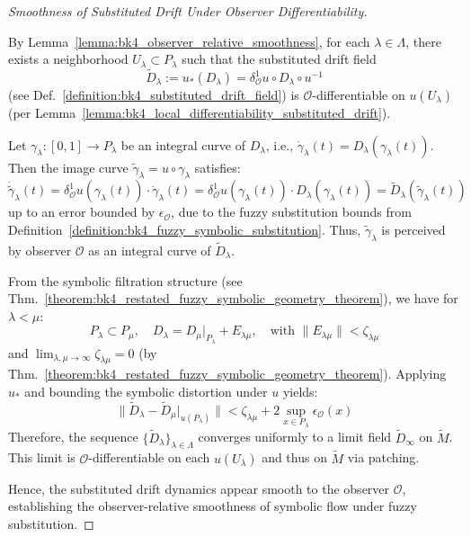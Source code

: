 \begin{proof}[Smoothness of Substituted Drift Under Observer Differentiability]
\label{proof:bk4_substituted_drift_smoothness}
\leavevmode

By Lemma~\ref{lemma:bk4_observer_relative_smoothness}, for each $\lambda \in \Lambda$, there exists a neighborhood $U_\lambda \subset P_\lambda$ such that the substituted drift field
\[
\tilde{D}_\lambda := u_*(D_\lambda) = \delta^1_\mathcal{O}u \circ D_\lambda \circ u^{-1}
\]
(see Def.~\ref{definition:bk4_substituted_drift_field}) is $\mathcal{O}$-differentiable on $u(U_\lambda)$ (per Lemma~\ref{lemma:bk4_local_differentiability_substituted_drift}).

Let $\gamma_\lambda: [0,1] \to P_\lambda$ be an integral curve of $D_\lambda$, i.e., $\dot{\gamma}_\lambda(t) = D_\lambda(\gamma_\lambda(t))$. Then the image curve $\tilde{\gamma}_\lambda = u \circ \gamma_\lambda$ satisfies:
\[
\dot{\tilde{\gamma}}_\lambda(t) = \delta^1_\mathcal{O}u(\gamma_\lambda(t)) \cdot \dot{\gamma}_\lambda(t) = \delta^1_\mathcal{O}u(\gamma_\lambda(t)) \cdot D_\lambda(\gamma_\lambda(t)) = \tilde{D}_\lambda(\tilde{\gamma}_\lambda(t))
\]
up to an error bounded by $\epsilon_\mathcal{O}$, due to the fuzzy substitution bounds from Definition~\ref{definition:bk4_fuzzy_symbolic_substitution}. Thus, $\tilde{\gamma}_\lambda$ is perceived by observer $\mathcal{O}$ as an integral curve of $\tilde{D}_\lambda$.

From the symbolic filtration structure (see Thm.~\ref{theorem:bk4_restated_fuzzy_symbolic_geometry_theorem}), we have for $\lambda < \mu$:
\[
P_\lambda \subset P_\mu, \quad D_\lambda = D_\mu|_{P_\lambda} + E_{\lambda\mu}, \quad \text{with } \|E_{\lambda\mu}\| < \zeta_{\lambda\mu}
\]
and $\lim_{\lambda, \mu \to \infty} \zeta_{\lambda\mu} = 0$ (by Thm.~\ref{theorem:bk4_restated_fuzzy_symbolic_geometry_theorem}). Applying $u_*$ and bounding the symbolic distortion under $u$ yields:
\[
\|\tilde{D}_\lambda - \tilde{D}_\mu|_{u(P_\lambda)}\| < \zeta_{\lambda\mu} + 2\sup_{x \in P_\lambda} \epsilon_\mathcal{O}(x)
\]
Therefore, the sequence $\{\tilde{D}_\lambda\}_{\lambda \in \Lambda}$ converges uniformly to a limit field $\tilde{D}_\infty$ on $\tilde{M}$. This limit is $\mathcal{O}$-differentiable on each $u(U_\lambda)$ and thus on $\tilde{M}$ via patching.

Hence, the substituted drift dynamics appear smooth to the observer $\mathcal{O}$, establishing the observer-relative smoothness of symbolic flow under fuzzy substitution.
\end{proof}

